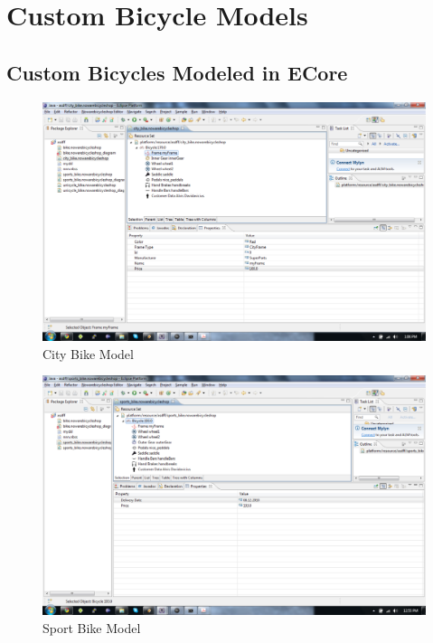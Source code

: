 \section{Custom Bicycle Models}
\label{appendix.custom_bicycles}

\subsection{Custom Bicycles Modeled in ECore}
\label{appendix.emf_models}

\begin{figure}[H]
    \begin{center}
        \includegraphics[width=\textwidth]{fig/ecore_model_examples/new/ecore_city_model.pdf}
        \caption{City Bike Model}
        \label{fig.emf_city_bike}
    \end{center}
\end{figure}

\begin{figure}[H]
    \begin{center}
        \includegraphics[width=\textwidth]{fig/ecore_model_examples/new/ecore_sport_model.pdf}
        \caption{Sport Bike Model}
        \label{fig.emf_sport_model}
    \end{center}
\end{figure}

